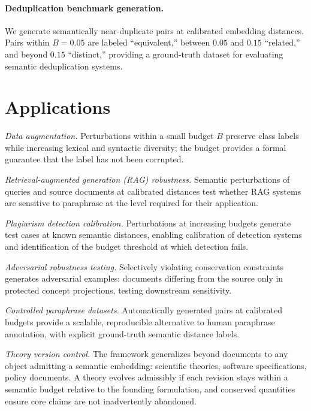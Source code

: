 \documentclass[12pt, a4paper]{article}
\theoremstyle{plain}
\theoremstyle{definition}
\theoremstyle{remark}
\begin{document}
\paragraph{Deduplication benchmark generation.}
We generate semantically near-duplicate pairs at calibrated embedding distances.
Pairs within $B = 0.05$ are labeled ``equivalent,'' between $0.05$ and $0.15$
``related,'' and beyond $0.15$ ``distinct,'' providing a ground-truth dataset
for evaluating semantic deduplication systems.


\section{Applications}
\label{sec:applications}

\emph{Data augmentation.}  Perturbations within a small budget $B$ preserve
class labels while increasing lexical and syntactic diversity; the budget
provides a formal guarantee that the label has not been corrupted.

\emph{Retrieval-augmented generation (RAG) robustness.}  Semantic perturbations
of queries and source documents at calibrated distances test whether RAG systems
are sensitive to paraphrase at the level required for their application.

\emph{Plagiarism detection calibration.}  Perturbations at increasing budgets
generate test cases at known semantic distances, enabling calibration of detection
systems and identification of the budget threshold at which detection fails.

\emph{Adversarial robustness testing.}  Selectively violating conservation
constraints generates adversarial examples: documents differing from the source
only in protected concept projections, testing downstream sensitivity.

\emph{Controlled paraphrase datasets.}  Automatically generated pairs at
calibrated budgets provide a scalable, reproducible alternative to human
paraphrase annotation, with explicit ground-truth semantic distance labels.

\emph{Theory version control.}  The framework generalizes beyond documents to
any object admitting a semantic embedding: scientific theories, software
specifications, policy documents.  A theory evolves admissibly if each revision
stays within a semantic budget relative to the founding formulation, and
conserved quantities ensure core claims are not inadvertently abandoned.
\end{document}
